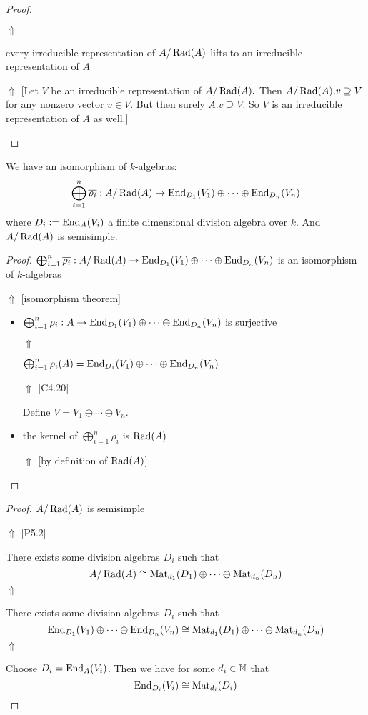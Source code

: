 \begin{proof}
\begin{itemize}
\(\Uparrow \)

every irreducible representation of \(A/\operatorname{Rad}(A)\) lifts to an irreducible representation of \(A\)

\(\Uparrow \)  [Let \(V\) be an irreducible representation of \(A/\operatorname{Rad}(A).\) Then \(A/\operatorname{Rad}(A).v\supseteq V\) for any nonzero vector \(v\in V.\) But then surely \(A.v\supseteq V\). So \(V\) is an irreducible representation of \(A\) as well.]
\end{itemize}

\end{proof}

\begin{prop}
We have an isomorphism of \(k\)-algebras:
\[
\bigoplus_{i=1}^n \overline{\rho _{i}} : A/\operatorname{Rad}(A) \rightarrow  \operatorname{End}_{D_{1}}(V_{1})\oplus \cdots \oplus \operatorname{End}_{D_{n}}(V_{n})
\]
where \(D_{i}:=\operatorname{End}_A(V_{i})\) a finite dimensional division algebra over \(k\).
And \(A/\operatorname{Rad}(A)\) is semisimple.
\end{prop}

\begin{proof}
\(\bigoplus_{i=1}^n \overline{\rho _{i}} : A/\operatorname{Rad}(A) \rightarrow  \operatorname{End}_{D_{1}}(V_{1})\oplus \cdots \oplus \operatorname{End}_{D_{n}}(V_{n})\) is an isomorphism of \(k\)-algebras

\(\Uparrow \)  [isomorphism theorem]

\begin{itemize}
  \item \(\bigoplus_{i=1}^n \rho _{i} : A \rightarrow  \operatorname{End}_{D_{1}}(V_{1})\oplus \cdots \oplus \operatorname{End}_{D_{n}}(V_{n})\) is surjective

\(\Uparrow \)

\(\bigoplus_{i=1}^n \rho _{i}(A)= \operatorname{End}_{D_{1}}(V_{1})\oplus \cdots \oplus \operatorname{End}_{D_{n}}(V_{n})\)

\(\Uparrow \)  [C4.20]

Define \(V=V_{1}\oplus \cdots \oplus V_{n}\).
  \item the kernel of \(\bigoplus_{i=1}^n \rho _{i}\) is \(\operatorname{Rad}(A)\)

\(\Uparrow \) [by definition of \(\operatorname{Rad}(A)\)]
\end{itemize}
\end{proof}

\begin{proof}
\(A/\operatorname{Rad}(A)\) is semisimple

\(\Uparrow \) [P5.2]

There exists some division algebras \(D_{i}\) such that
\[
A/\operatorname{Rad}(A)\cong \operatorname{Mat}_{d_{1}}(D_{1})\oplus \cdots \oplus \operatorname{Mat}_{d_{n}}(D_{n})
\]
\(\Uparrow \)

There exists some division algebras \(D_{i}\) such that
\[
\operatorname{End}_{D_{1}}(V_{1})\oplus \cdots \oplus \operatorname{End}_{D_{n}}(V_{n})\cong \operatorname{Mat}_{d_{1}}(D_{1})\oplus \cdots \oplus \operatorname{Mat}_{d_{n}}(D_{n})
\]
\(\Uparrow \)

Choose \(D_{i}=\operatorname{End}_A(V_{i})\). Then we have for some \(d_{i}\in \Bbb{N}\) that
\[
\operatorname{End}_{D_{i}}(V_{i})\cong \operatorname{Mat}_{d_{i}}(D_{i})
\]
\end{proof}


